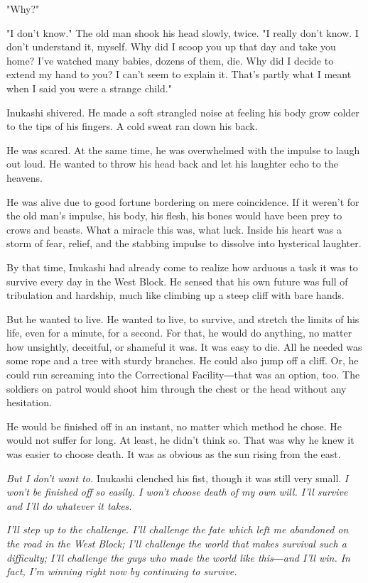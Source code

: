 "Why?"

"I don't know." The old man shook his head slowly, twice. "I really
don't know. I don't understand it, myself. Why did I scoop you up that
day and take you home? I've watched many babies, dozens of them, die.
Why did I decide to extend my hand to you? I can't seem to explain it.
That's partly what I meant when I said you were a strange child."

Inukashi shivered. He made a soft strangled noise at feeling his body
grow colder to the tips of his fingers. A cold sweat ran down his back.

He was scared. At the same time, he was overwhelmed with the impulse to
laugh out loud. He wanted to throw his head back and let his laughter
echo to the heavens.

He was alive due to good fortune bordering on mere coincidence. If it
weren't for the old man's impulse, his body, his flesh, his bones would
have been prey to crows and beasts. What a miracle this was, what luck.
Inside his heart was a storm of fear, relief, and the stabbing impulse
to dissolve into hysterical laughter.

By that time, Inukashi had already come to realize how arduous a task it
was to survive every day in the West Block. He sensed that his own
future was full of tribulation and hardship, much like climbing up a
steep cliff with bare hands.

But he wanted to live. He wanted to live, to survive, and stretch the
limits of his life, even for a minute, for a second. For that, he would
do anything, no matter how unsightly, deceitful, or shameful it was. It
was easy to die. All he needed was some rope and a tree with sturdy
branches. He could also jump off a cliff. Or, he could run screaming
into the Correctional Facility―that was an option, too. The soldiers on
patrol would shoot him through the chest or the head without any
hesitation.

He would be finished off in an instant, no matter which method he chose.
He would not suffer for long. At least, he didn't think so. That was why
he knew it was easier to choose death. It was as obvious as the sun
rising from the east.

\emph{But I don't want to.} Inukashi clenched his fist, though it was still
very small. \emph{I won't be finished off so easily. I won't choose death of
my own will. I'll survive and I'll do whatever it takes.}

\emph{I'll step up to the challenge. I'll challenge the fate which left me
abandoned on the road in the West Block; I'll challenge the world that
makes survival such a difficulty; I'll challenge the guys who made the
world like this―and I'll win. In fact, I'm winning right now by
continuing to survive.}

